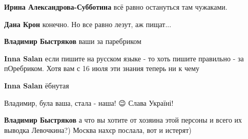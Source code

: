 \begin{itemize}
\begin{itemize}
\textbf{Ирина Александрова-Субботина} всё равно остануться там чужаками.

 
\textbf{Дана Крон} конечно. Но все равно лезут, аж пищат...

 
\textbf{Владимир Быстряков} ваши за паребриком

 
\textbf{Inna Salan} если пишите на русском языке - то хоть пишите правильно - за пОребриком. Хотя вам с 16 июля эти знания теперь ни к чему

 
\textbf{Inna Salan} ёбнутая

 
Владимир, була ваша, стала - наша! 😉
Слава Україні!

 
\textbf{Владимир Быстряков} а что вы хотите от хозяина этой персоны и всего их выводка Левочкина?) Москва нахєр послала, вот и истерят)

 

\end{itemize}
\end{itemize}
